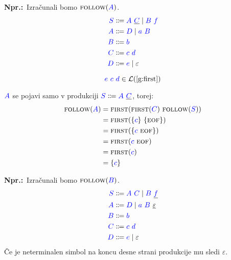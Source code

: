 \documentclass{article}
\newcommand{\Ex}{\textbf{Npr.:}\ }
\newcommand{\FIRST}{\textsc{first}}
\newcommand{\FOLLOW}{\textsc{follow}}
\newcommand{\EOF}{\textsc{eof}}
\newcommand{\Symbol}[1]{\textcolor{blue}{#1}}
\newcommand{\Null}{\varepsilon}
\newcommand{\Language}[1]{\mathcal{L}(#1)}
\newcommand{\MathRef}[1]{\text{\ref{#1}}}
\newcommand{\Arrow}{\Coloneq}
\newcommand{\Seq}{\ }
\newcommand{\Union}{\mathrel{|}}
\begin{document}
\Ex Izračunali bomo $\FOLLOW(\Symbol{A})$.
\begin{equation*}
  \begin{aligned}
    \Symbol{S} &\Arrow \Symbol{A} \Seq \underline{\Symbol{C}} \Union \Symbol{B} \Seq \Symbol{f} \\
    \Symbol{A} &\Arrow \Symbol{D} \Union \Symbol{a} \Seq \Symbol{B} \\
    \Symbol{B} &\Arrow \Symbol{b}\\
    \Symbol{C} &\Arrow \Symbol{c} \Seq \Symbol{d}\\
    \Symbol{D} &\Arrow \Symbol{e} \Union \Null
  \end{aligned}
\end{equation*}

\begin{equation*}
  \Symbol{e} \Seq \Symbol{c} \Seq \Symbol{d} \in \Language{\MathRef{g:first}}
\end{equation*}

$\Symbol{A}$ se pojavi samo v produkciji $\Symbol{S} \Arrow \Symbol{A} \Seq \underline{\Symbol{C}}$, torej:
\begin{align*}
  \FOLLOW(\Symbol{A}) &= \FIRST(\FIRST(\Symbol{C}) \Seq \FOLLOW(\Symbol{S})) \\
             &= \FIRST(\{\Symbol{c}\} \Seq \{\EOF\})\\
             &= \FIRST(\{\Symbol{c} \Seq \EOF\})\\
             &= \FIRST(\Symbol{c} \Seq \EOF) \\
             &= \FIRST(\Symbol{c}) \\
             &= \{\Symbol{c}\}
\end{align*}

\Ex Izračunali bomo $\FOLLOW(\Symbol{B})$.
\begin{equation*}
  \begin{aligned}
    \Symbol{S} &\Arrow \Symbol{A} \Seq \Symbol{C} \Union \Symbol{B} \Seq \underline{\Symbol{f}} \\
    \Symbol{A} &\Arrow \Symbol{D} \Union \Symbol{a} \Seq \Symbol{B} \Seq \underline{\Null} \\
    \Symbol{B} &\Arrow \Symbol{b}\\
    \Symbol{C} &\Arrow \Symbol{c} \Seq \Symbol{d}\\
    \Symbol{D} &\Arrow \Symbol{e} \Union \Null
  \end{aligned}
\end{equation*}
Če je neterminalen simbol na koncu desne strani produkcije mu sledi $\Null$.
\end{document}
